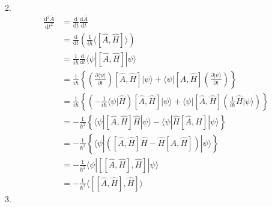 2.
\begin{equation}
    \begin{aligned}
        \frac{\mathrm{d}^2\bar{A}}{\mathrm{d}t^2}&=\frac{\mathrm{d}}{\mathrm{d}t}\frac{\mathrm{d}\bar{A}}{\mathrm{d}t}
\\
&=\frac{\mathrm{d}}{\mathrm{d}t}\left( \frac{1}{i\hbar}\langle [\hat{A},\hat{H}]\rangle \right) 
\\
&=\frac{1}{i\hbar}\frac{\mathrm{d}}{\mathrm{d}t}\langle \psi |[\hat{A},\hat{H}]|\psi \rangle 
\\
&=\frac{1}{i\hbar}\left\{ \left( \frac{\partial \langle \psi |}{\partial t} \right) [\hat{A},\hat{H}]|\psi \rangle +\langle \psi |[\hat{A},\hat{H}]\left( \frac{\partial |\psi \rangle}{\partial t} \right) \right\} 
\\
&=\frac{1}{i\hbar}\left\{ \left( -\frac{1}{i\hbar}\langle \psi |\hat{H} \right) [\hat{A},\hat{H}]|\psi \rangle +\langle \psi |[\hat{A},\hat{H}]\left( \frac{1}{i\hbar}\hat{H}|\psi \rangle \right) \right\} 
\\
&=-\frac{1}{\hbar ^2}\left\{ \langle \psi |[\hat{A},\hat{H}]\hat{H}|\psi \rangle -\langle \psi |\hat{H}[\hat{A},\hat{H}]|\psi \rangle \right\} 
\\
&=-\frac{1}{\hbar ^2}\left\{ \langle \psi |\left( [\hat{A},\hat{H}]\hat{H}-\hat{H}[\hat{A},\hat{H}] \right) |\psi \rangle \right\} 
\\
&=-\frac{1}{\hbar ^2}\langle \psi |[[\hat{A},\hat{H}],\hat{H}]|\psi \rangle 
\\
&=-\frac{1}{\hbar ^2}\langle [[\hat{A},\hat{H}],\hat{H}]\rangle 
    \end{aligned}
\end{equation}
3.
